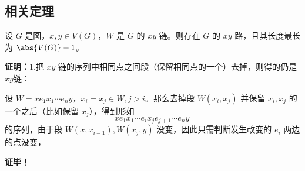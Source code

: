  
\subsection{相关定理}
\begin{theorem}{}
设 $G$ 是图，$x,y\in V(G)$，$W$ 是 $G$ 的 $xy$ 链。则存在 $G$ 的 $xy$ 路，且其长度最长为 $\abs{V(G)}-1$。
\end{theorem}

\textbf{证明：}1.把 $xy$ 链的序列中相同点之间段（保留相同点的一个）去掉，则得的仍是 $xy$链：

设 $W=xe_1x_1\cdots e_n y$，$x_i=x_j\in W,j>i$。那么去掉段 $W(x_i,x_j)$ 并保留 $x_i,x_j$ 的一个之后（比如保留 $x_j$），得到形如 
\begin{equation}
xe_1x_1\cdots e_{i}x_j e_{j+1}\cdots e_n y~
\end{equation}
的序列，由于段 $W(x,x_{i-1}),W(x_j,y)$ 没变，因此只需判断发生改变的 $e_i$ 两边的点没变，


\textbf{证毕！}
















